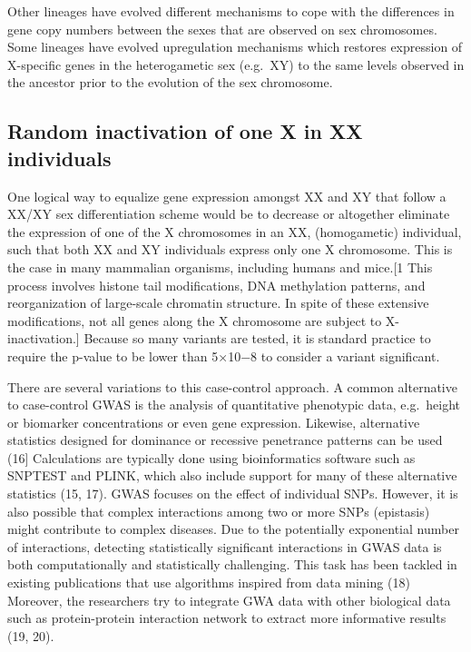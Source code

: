 \documentclass[
]{book}
\begin{document}
Other lineages have evolved different mechanisms to cope with the differences in gene copy numbers between the sexes that are observed on sex chromosomes. Some lineages have evolved upregulation mechanisms which restores expression of X-specific genes in the heterogametic sex (e.g.~XY) to the same levels observed in the ancestor prior to the evolution of the sex chromosome.

\hypertarget{random-inactivation-of-one-x-in-xx-individuals}{%
\subsection{Random inactivation of one X in XX individuals}\label{random-inactivation-of-one-x-in-xx-individuals}}

One logical way to equalize gene expression amongst XX and XY that follow a XX/XY sex differentiation scheme would be to decrease or altogether eliminate the expression of one of the X chromosomes in an XX, (homogametic) individual, such that both XX and XY individuals express only one X chromosome. This is the case in many mammalian organisms, including humans and mice.{[}1 This process involves histone tail modifications, DNA methylation patterns, and reorganization of large-scale chromatin structure. In spite of these extensive modifications, not all genes along the X chromosome are subject to X-inactivation.{]} Because so many variants are tested, it is standard practice to require the p-value to be lower than 5×10−8 to consider a variant significant.

There are several variations to this case-control approach. A common alternative to case-control GWAS is the analysis of quantitative phenotypic data, e.g.~height or biomarker concentrations or even gene expression. Likewise, alternative statistics designed for dominance or recessive penetrance patterns can be used (16{]} Calculations are typically done using bioinformatics software such as SNPTEST and PLINK, which also include support for many of these alternative statistics (15, 17). GWAS focuses on the effect of individual SNPs. However, it is also possible that complex interactions among two or more SNPs (epistasis) might contribute to complex diseases. Due to the potentially exponential number of interactions, detecting statistically significant interactions in GWAS data is both computationally and statistically challenging. This task has been tackled in existing publications that use algorithms inspired from data mining (18) Moreover, the researchers try to integrate GWA data with other biological data such as protein-protein interaction network to extract more informative results (19, 20).
\end{document}
